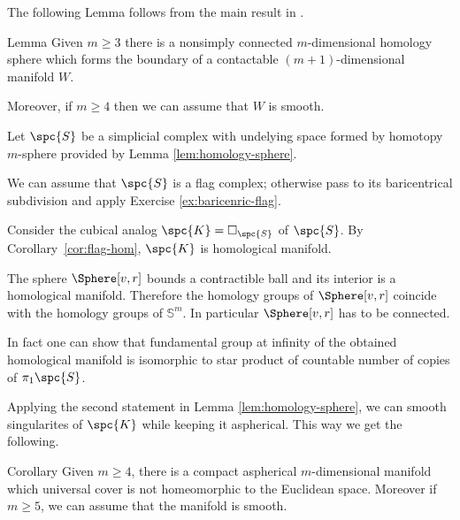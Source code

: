 The following Lemma follows from the main result in \cite{kervaire}.

\begin{thm}{Lemma}\label{lem:homology-sphere}
Given $m\ge 3$ there is a nonsimply connected $m$-dimensional homology sphere which forms the boundary of a contactable $(m+1)$-dimensional manifold $W$.

Moreover, if $m\ge 4$ then we can assume that $W$ is smooth.
\end{thm}

Let $\spc{S}$ be a simplicial complex 
with undelying space formed by homotopy $m$-sphere provided by Lemma \ref{lem:homology-sphere}.

We can assume that $\spc{S}$ is a flag complex;
otherwise pass to its baricentrical subdivision and apply Exercise \ref{ex:baricenric-flag}.

Consider the cubical analog $\spc{K}=\square_{\spc{S}}$ of $\spc{S}$.
By Corollary~\ref{cor:flag-hom}, $\spc{K}$ is homological manifold.

The sphere $\Sphere[v,r]$ bounds a contractible ball 
and its interior is a homological manifold.
Therefore the homology groups of $\Sphere[v,r]$
coincide with the homology groups of $\mathbb{S}^m$.
In particular $\Sphere[v,r]$ has to be connected.
\qeds

In fact one can show that fundamental group at infinity
of the obtained homological manifold is isomorphic to 
star product of countable number of copies of $\pi_1\spc{S}$.

Applying the second statement in Lemma \ref{lem:homology-sphere},
we can smooth singularites of $\spc{K}$ while keeping it aspherical.
This way we get the following.

\begin{thm}{Corollary}
Given $m\ge 4$,
there is a compact aspherical $m$-dimensional manifold 
which universal cover is not homeomorphic to the Euclidean space.
Moreover if $m\ge 5$, we can assume that the manifold is smooth.
\end{thm}
























